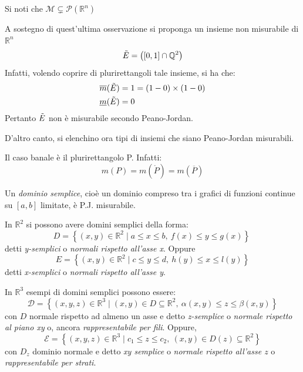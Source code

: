 \begin{oss}
    Si noti che $\mathcal{M} \subsetneq \mathcal{P}(\mathbb{R}^n)$
\end{oss}
\begin{example}
    A sostegno di quest'ultima osservazione si proponga un insieme non misurabile di $\mathbb{R}^n$
    \begin{equation*}
        \Tilde{E}=\left( \left[0,1\right] \cap \mathbb{Q}^2\right)
    \end{equation*}
    Infatti, volendo coprire di plurirettangoli tale insieme, si ha che:
    \begin{align*}
        &\overline{m}(\Tilde{E})=1=(1-0)\times(1-0)\\
        &\underline{m}(\Tilde{E})=0
    \end{align*}
    Pertanto $\Tilde{E}$ non è misurabile secondo Peano-Jordan.
\end{example}
D'altro canto, si elenchino ora tipi di insiemi che siano Peano-Jordan misurabili.
\begin{example}
    Il caso banale è il plurirettangolo P. Infatti:
    \begin{equation*}
    m(P)=m(\mathring{P})=m(\overline{P})       
    \end{equation*}
\end{example}
\begin{example} \label{Def: Dominio normale}
    Un \textit{dominio semplice}, cioè un dominio compreso tra i grafici di funzioni continue su $\left[a,b\right]$ limitate, è P.J. misurabile.
    
    In $\mathbb{R}^2$ si possono avere domini semplici della forma:
    \begin{equation*}
            D= \left\{ (x, y) \in \mathbb{R}^2 \mid a \leq x \leq b ,\ f(x)\leq y \leq g(x) \right\}\        
    \end{equation*}
    detti \textit{y-semplici} o \textit{normali rispetto all'asse x}. Oppure
    \begin{equation*}
        E= \left\{(x, y) \in \mathbb{R}^2\mid c \leq y \leq d,\ h(y) \leq x \leq l(y)\right\}
    \end{equation*}
    detti \textit{x-semplici} o \textit{normali rispetto all'asse y}.
    \vspace*{6pt}                       
    
    In $\mathbb{R}^3$ esempi di domini semplici possono essere:
    \begin{equation*}
        \mathcal{D}=\left\{(x,y,z) \in \mathbb{R}^3 \mid (x,y) \in D \subseteq \mathbb{R}^2,\ \alpha(x, y) \leq z \leq \beta(x,y) \right\}
    \end{equation*}
    con $D$ normale rispetto ad almeno un asse e detto \textit{z-semplice} o \textit{normale rispetto al piano xy} o, ancora \textit{rappresentabile per fili}. Oppure, 
    \begin{equation*}
        \mathcal{E}=\left\{(x,y,z) \in \mathbb{R}^3 \mid c_1 \leq z \leq c_2,\ (x,y) \in D(z)\subseteq \mathbb{R}^2\right\}
    \end{equation*}
    con $D_z$ dominio normale e detto \textit{xy semplice} o \textit{normale rispetto all'asse $z$} o \textit{rappresentabile per strati}.
\end{example}
